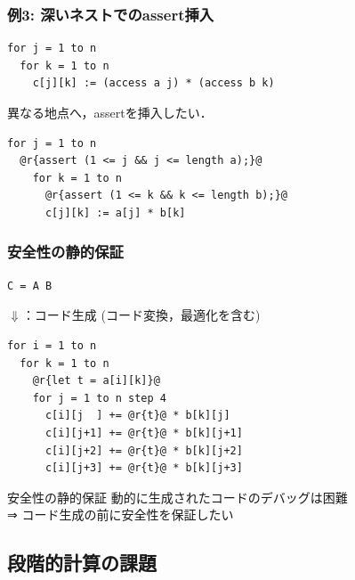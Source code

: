 \documentclass[dvipdfmx,cjk,xcolor=dvipsnames,envcountsect,notheorems,12pt,handout]{beamer} \usepackage{pgfpages} \pgfpagesuselayout{4 on 1}[a4paper,landscape,border shrink=5mm]
\theoremstyle{definition}
\begin{document}
\begin{frame}[fragile]
  \frametitle{例3: 深いネストでのassert挿入}

\begin{lstlisting}
for j = 1 to n
  for k = 1 to n
    c[j][k] := (access a j) * (access b k)
\end{lstlisting}
  \pause
  異なる地点へ，assertを挿入したい．
\begin{lstlisting}
for j = 1 to n
  @r{assert (1 <= j && j <= length a);}@
    for k = 1 to n
      @r{assert (1 <= k && k <= length b);}@
      c[j][k] := a[j] * b[k]
\end{lstlisting}

\end{frame}

\begin{frame}[fragile]
  \frametitle{安全性の静的保証}
\begin{lstlisting}
C = A B
\end{lstlisting}
  \begin{center}
    $\Downarrow$：コード生成 (コード変換，最適化を含む)
  \end{center}
\begin{lstlisting}
for i = 1 to n
  for k = 1 to n
    @r{let t = a[i][k]}@
    for j = 1 to n step 4
      c[i][j  ] += @r{t}@ * b[k][j]
      c[i][j+1] += @r{t}@ * b[k][j+1]
      c[i][j+2] += @r{t}@ * b[k][j+2]
      c[i][j+3] += @r{t}@ * b[k][j+3]
\end{lstlisting}

  \begin{exampleblock}{安全性の静的保証}
    動的に生成されたコードのデバッグは困難\\
    ⇒ コード生成の前に安全性を保証したい
  \end{exampleblock}

\end{frame}

\subsection{段階的計算の課題}
\end{document}

